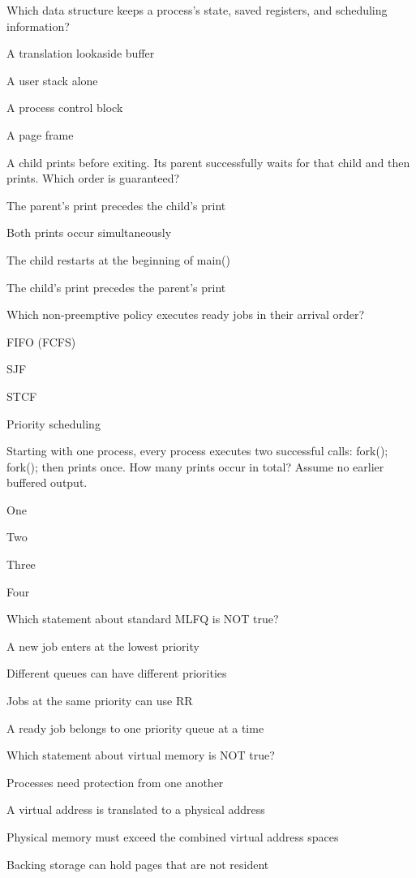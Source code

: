 \begin{questions}\setlength{\itemsep}{0.12cm}\setcounter{question}{12}
\question Which data structure keeps a process's state, saved registers, and scheduling information?
\begin{verticalchoices}
\item A translation lookaside buffer
\item A user stack alone
\item A process control block
\item A page frame
\end{verticalchoices}
\question A child prints before exiting. Its parent successfully waits for that child and then prints. Which order is guaranteed?
\begin{verticalchoices}
\item The parent's print precedes the child's print
\item Both prints occur simultaneously
\item The child restarts at the beginning of main()
\item The child's print precedes the parent's print
\end{verticalchoices}
\question Which non-preemptive policy executes ready jobs in their arrival order?
\begin{verticalchoices}
\item FIFO (FCFS)
\item SJF
\item STCF
\item Priority scheduling
\end{verticalchoices}
\question Starting with one process, every process executes two successful calls: fork(); fork(); then prints once. How many prints occur in total? Assume no earlier buffered output.
\begin{verticalchoices}
\item One
\item Two
\item Three
\item Four
\end{verticalchoices}
\question Which statement about standard MLFQ is NOT true?
\begin{verticalchoices}
\item A new job enters at the lowest priority
\item Different queues can have different priorities
\item Jobs at the same priority can use RR
\item A ready job belongs to one priority queue at a time
\end{verticalchoices}
\question Which statement about virtual memory is NOT true?
\begin{verticalchoices}
\item Processes need protection from one another
\item A virtual address is translated to a physical address
\item Physical memory must exceed the combined virtual address spaces
\item Backing storage can hold pages that are not resident
\end{verticalchoices}
\end{questions}\vfill\newpage
